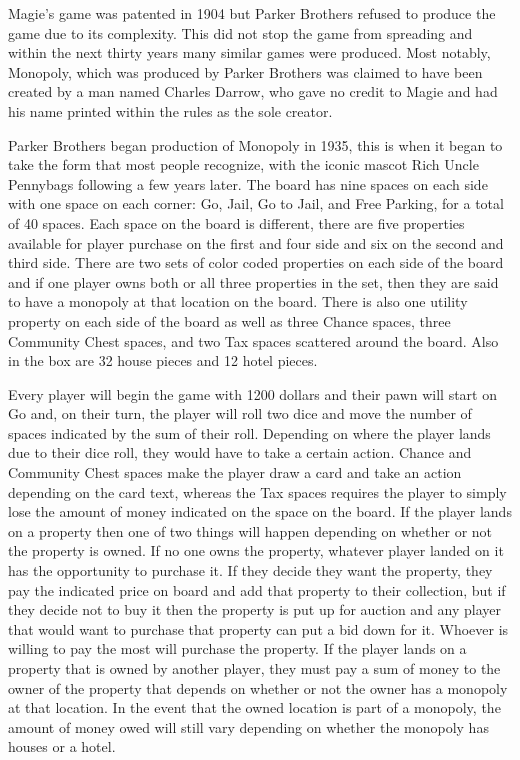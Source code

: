 \documentclass{article}
\begin{document}
	Magie’s game was patented in 1904 but Parker Brothers refused to produce the game due to its complexity.  This did not stop the game from spreading and within the next thirty years many similar games were produced.  Most notably, Monopoly, which was produced by Parker Brothers was claimed to have been created by a man named Charles Darrow, who gave no credit to Magie and had his name printed within the rules as the sole creator.

	Parker Brothers began production of Monopoly in 1935, this is when it began to take the form that most people recognize, with the iconic mascot Rich Uncle Pennybags following a few years later.  The board has nine spaces on each side with one space on each corner: Go, Jail, Go to Jail, and Free Parking, for a total of 40 spaces.  Each space on the board is different, there are five properties available for player purchase on the first and four side and six on the second and third side.  There are two sets of color coded properties on each side of the board and if one player owns both or all three properties in the set, then they are said to have a monopoly at that location on the board.  There is also one utility property on each side of the board as well as three Chance spaces, three Community Chest spaces, and two Tax spaces scattered around the board.  Also in the box are 32 house pieces and 12 hotel pieces.

	Every player will begin the game with 1200 dollars and their pawn will start on Go and, on their turn, the player will roll two dice and move the number of spaces indicated by the sum of their roll.  Depending on where the player lands due to their dice roll, they would have to take a certain action.  Chance and Community Chest spaces make the player draw a card and take an action depending on the card text, whereas the Tax spaces requires the player to simply lose the amount of money indicated on the space on the board.  If the player lands on a property then one of two things will happen depending on whether or not the property is owned.  If no one owns the property, whatever player landed on it has the opportunity to purchase it.  If they decide they want the property, they pay the indicated price on board and add that property to their collection, but if they decide not to buy it then the property is put up for auction and any player that would want to purchase that property can put a bid down for it.  Whoever is willing to pay the most will purchase the property.  If the player lands on a property that is owned by another player, they must pay a sum of money to the owner of the property that depends on whether or not the owner has a monopoly at that location.  In the event that the owned location is part of a monopoly, the amount of money owed will still vary depending on whether the monopoly has houses or a hotel.
\end{document}
